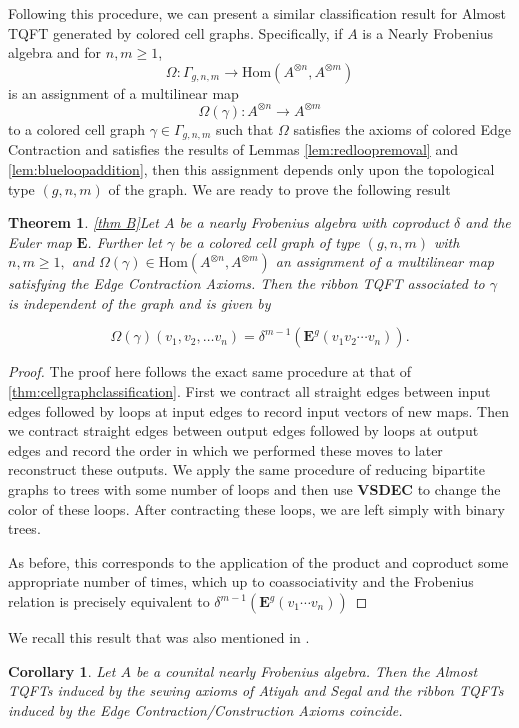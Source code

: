 \documentclass{amsart}
\newcommand{\be}{\begin{equation}}
\newcommand{\ee}{\end{equation}}
\newcommand{\tensor}{\otimes}
\newcommand{\Hom}{\mathrm{Hom}}
\newcommand{\Atn}{A^{\tensor n}}
\newcommand{\Atm}{A^{\tensor m}}
\newcommand{\bige}{\mathbf{E}}
\newtheorem{Thm}[Lem]{Theorem}
\newtheorem{Cor}[Lem]{Corollary}
\theoremstyle{definition}
\begin{document}
\noindent Following this procedure, we can present a similar classification result for Almost TQFT generated by colored cell graphs. Specifically, if $A$ is a Nearly Frobenius algebra and for $n,m\geq 1$, \be
\Omega:\Gamma_{g,n,m}\longrightarrow\Hom(\Atn,\Atm)
\ee
\noindent is an assignment of a multilinear map
\be
\Omega(\gamma):\Atn\longrightarrow\Atm
\ee
to a colored cell graph $\gamma\in\Gamma_{g,n,m}$ such that $\Omega$ satisfies the axioms of colored Edge Contraction and satisfies the results of Lemmas \ref{lem:redloopremoval} and \ref{lem:blueloopaddition}, then this assignment depends only upon the topological type $(g,n,m)$ of the graph. We are ready to prove the following result
\begin{Thm}\ref{thm B}\label{thm:infcellgraph}
    Let $A$ be a nearly Frobenius algebra with  coproduct $\delta$ and the Euler map $\bige$. Further let $\gamma$ be a colored cell graph of type $(g,n,m)$ with $n,m\geq 1,$ and $\Omega(\gamma)\in \Hom(A^{\tensor n}, A^{\tensor m})$ an assignment of a multilinear map satisfying  the Edge Contraction Axioms. Then the {\it ribbon TQFT} associated to $\gamma$ is independent of the graph and is given by

    \be
    \Omega(\gamma)(v_1,v_2,\ldots v_n)=\delta^{m-1}(\bige^g(v_1v_2\cdots v_n)).
    \ee
\end{Thm}
\begin{proof}
    The proof here follows the exact same procedure at that of \ref{thm:cellgraphclassification}. First we contract all straight edges between input edges followed by loops at input edges to record input vectors of new maps. Then we contract straight edges between output edges followed by loops at output edges and record the order in which we performed these moves to later reconstruct these outputs. We apply the same procedure of reducing bipartite graphs to trees with some number of loops and then use \textbf{VSDEC} to change the color of these loops. After contracting these loops, we are left simply with binary trees.

    \noindent As before, this corresponds to the application of the product and coproduct some appropriate number of times, which up to coassociativity and the Frobenius relation is precisely equivalent to $\delta^{m-1}(\bige^g(v_1\cdots v_n))$
\end{proof}

\noindent
We recall this result that was also mentioned in \cite{DaDu, thesis} .

\begin{Cor}\label{tqfts} Let $A$ be a counital nearly Frobenius algebra. Then the Almost TQFTs induced by the sewing axioms of Atiyah and Segal and the ribbon TQFTs induced by the Edge Contraction/Construction Axioms coincide. 
	\end{Cor}
	
\end{document}
